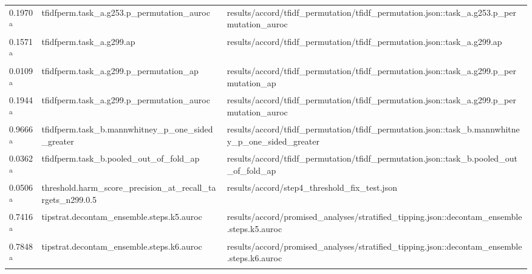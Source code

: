 \begin{longtable}{@{}p{0.7in}p{1.9in}p{2.6in}@{}}
0.1970 \textsuperscript{a} & tfidfperm.\allowbreak{}task\_a.\allowbreak{}g253.\allowbreak{}p\_permutation\_auroc & results/\allowbreak{}accord/\allowbreak{}tfidf\_permutation/\allowbreak{}tfidf\_permutation.\allowbreak{}json::task\_a.\allowbreak{}g253.\allowbreak{}p\_permutation\_auroc\\
0.1571 \textsuperscript{a} & tfidfperm.\allowbreak{}task\_a.\allowbreak{}g299.\allowbreak{}ap & results/\allowbreak{}accord/\allowbreak{}tfidf\_permutation/\allowbreak{}tfidf\_permutation.\allowbreak{}json::task\_a.\allowbreak{}g299.\allowbreak{}ap\\
0.0109 \textsuperscript{a} & tfidfperm.\allowbreak{}task\_a.\allowbreak{}g299.\allowbreak{}p\_permutation\_ap & results/\allowbreak{}accord/\allowbreak{}tfidf\_permutation/\allowbreak{}tfidf\_permutation.\allowbreak{}json::task\_a.\allowbreak{}g299.\allowbreak{}p\_permutation\_ap\\
0.1944 \textsuperscript{a} & tfidfperm.\allowbreak{}task\_a.\allowbreak{}g299.\allowbreak{}p\_permutation\_auroc & results/\allowbreak{}accord/\allowbreak{}tfidf\_permutation/\allowbreak{}tfidf\_permutation.\allowbreak{}json::task\_a.\allowbreak{}g299.\allowbreak{}p\_permutation\_auroc\\
0.9666 \textsuperscript{a} & tfidfperm.\allowbreak{}task\_b.\allowbreak{}mannwhitney\_p\_one\_sided\_greater & results/\allowbreak{}accord/\allowbreak{}tfidf\_permutation/\allowbreak{}tfidf\_permutation.\allowbreak{}json::task\_b.\allowbreak{}mannwhitney\_p\_one\_sided\_greater\\
0.0362 \textsuperscript{a} & tfidfperm.\allowbreak{}task\_b.\allowbreak{}pooled\_out\_of\_fold\_ap & results/\allowbreak{}accord/\allowbreak{}tfidf\_permutation/\allowbreak{}tfidf\_permutation.\allowbreak{}json::task\_b.\allowbreak{}pooled\_out\_of\_fold\_ap\\
0.0506 \textsuperscript{a} & threshold.\allowbreak{}harm\_score\_precision\_at\_recall\_targets\_n299.\allowbreak{}0.\allowbreak{}5 & results/\allowbreak{}accord/\allowbreak{}step4\_threshold\_fix\_test.\allowbreak{}json\\
0.7416 \textsuperscript{a} & tipstrat.\allowbreak{}decontam\_ensemble.\allowbreak{}steps.\allowbreak{}k5.\allowbreak{}auroc & results/\allowbreak{}accord/\allowbreak{}promised\_analyses/\allowbreak{}stratified\_tipping.\allowbreak{}json::decontam\_ensemble.\allowbreak{}steps.\allowbreak{}k5.\allowbreak{}auroc\\
0.7848 \textsuperscript{a} & tipstrat.\allowbreak{}decontam\_ensemble.\allowbreak{}steps.\allowbreak{}k6.\allowbreak{}auroc & results/\allowbreak{}accord/\allowbreak{}promised\_analyses/\allowbreak{}stratified\_tipping.\allowbreak{}json::decontam\_ensemble.\allowbreak{}steps.\allowbreak{}k6.\allowbreak{}auroc\\

\end{longtable}
